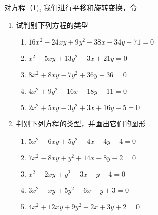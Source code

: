 对方程（1), 我们进行平移和旋转变换，令












































































\begin{ex}
\begin{enumerate}
    \item 试判别下列方程的类型
\begin{enumerate}
\item $16x^2-24xy+9y^2-38x-34y+71=0$
\item $x^2-5xy+13y^2-3x+21y=0$
\item $8x^2+8xy-7y^2+36y+36=0$
\item $4x^2+9y^2-16x-18y-11=0$
\item $2x^2+5xy-3y^2+3x+16y-5=0$
\end{enumerate}

    \item 判别下列方程的类型，并画出它们的图形
\begin{enumerate}
\item $5x^2-6xy+5y^2-4x-4y-4=0$
\item $7x^2-8xy+y^2+14x-8y-2=0$
\item $x^2-2xy+y^2+3x-y-4=0$
\item $3x^2-xy+5y^2-6x+y+3=0$
\item $4x^2+12xy+9y^2+2x+3y+2=0$   
\end{enumerate}

\end{enumerate}    
\end{ex}

